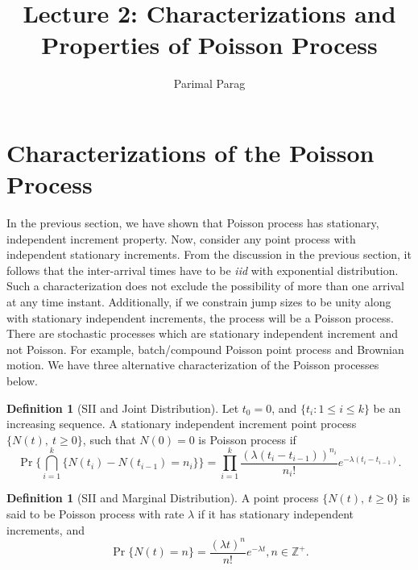 \documentclass[a4paper,10pt]{article}
\date{}
\title{Lecture 2: Characterizations and Properties of Poisson Process}
\author{Parimal Parag}
\theoremstyle{plain}
\theoremstyle{definition}
\newtheorem{defn}[thm]{Definition}
\begin{document}
\maketitle

\section{Characterizations of the Poisson Process}

In the previous section, we have shown that Poisson process has stationary, independent increment property. Now, consider any point process with independent stationary increments. From the discussion in the previous section, it follows that the inter-arrival times have to be \emph{iid} with exponential distribution. Such a characterization does not exclude the possibility of more than one arrival at any time instant. Additionally, if we constrain jump sizes to be unity along with stationary independent increments, the process will be a Poisson process. There are stochastic processes which are stationary independent increment and not Poisson. For example, batch/compound Poisson point process and Brownian motion. We have three alternative characterization of the Poisson processes below. 

\begin{defn}[SII and Joint Distribution]\label{defn:SIIJoint} Let $t_0 = 0$, and $\{t_i: 1 \leq i \leq k\}$ be an increasing sequence. A stationary independent increment point process $\{N(t),~t\geqslant 0\}$, such that $N(0) = 0$ is Poisson process if 
\begin{equation*}
  \Pr\{\bigcap_{i=1}^k \{N(t_i)-N(t_{i-1})= n_{i}\}\} = \prod_{i=1}^{k}\frac{(\lambda(t_{i}-t_{i-1}))^{n_{i}}}{n_{i}!} e^{-\lambda (t_{i}-t_{i-1})}.
\end{equation*}
\end{defn}

\begin{defn}[SII and Marginal Distribution]\label{defn:SIIMarginal} A point process $\{N(t),~t\geqslant 0\}$ is said to be Poisson process with rate $\lambda$ if it has stationary independent increments, and 
\begin{equation*}
\Pr\{N(t)=n\}= \frac{(\lambda t)^{n}}{n!} e^{-\lambda t}, n\in \mathbb{Z}^+.
\end{equation*}
\end{defn}
\end{document}
